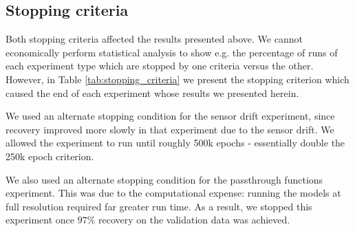 \documentclass[12pt]{iopart}
\begin{document}
\subsection{Stopping criteria}
\label{sup:stopping_criteria}

Both stopping criteria affected the results presented above. We cannot economically perform
statistical analysis to show e.g. the percentage of runs of each experiment type which
are stopped by one criteria versus the other. However, in Table \ref{tab:stopping_criteria}
we present the stopping criterion which caused the end of each experiment whose results
we presented herein.

We used an alternate stopping condition for the sensor drift experiment, since recovery improved
more slowly in that experiment due to the sensor drift. We allowed the experiment to run until
roughly 500k epochs - essentially double the 250k epoch criterion.

We also used an alternate stopping condition for the passthrough functions experiment. This
was due to the computational expense: running the models at full resolution required far
greater run time. As a result, we stopped this experiment once $97\%$ recovery on the
validation data was achieved.
\end{document}
